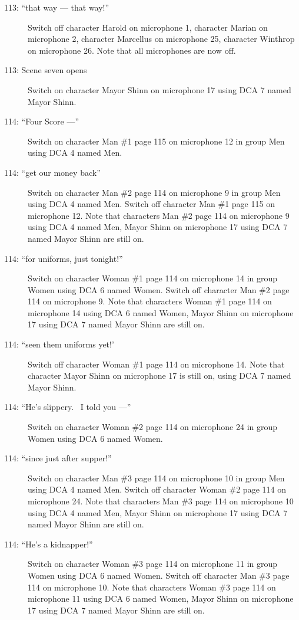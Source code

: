 \begin{description}
\item[113: ``that way --- that way!'']
Switch off character Harold on microphone 1, character Marian on microphone 2, character Marcellus on microphone 25, character Winthrop on microphone 26. Note that all microphones are now off.

\item[113: Scene seven opens]
Switch on character Mayor Shinn on microphone 17 using DCA 7 named Mayor Shinn. 

\item[114: ``Four Score ---'']
Switch on character Man \#1 page 115 on microphone 12 in group Men using DCA 4 named Men. 

\item[114: ``get our money back'']
Switch on character Man \#2 page 114 on microphone 9 in group Men using DCA 4 named Men. Switch off character Man \#1 page 115 on microphone 12. Note that characters Man \#2 page 114 on microphone 9 using DCA 4 named Men, Mayor Shinn on microphone 17 using DCA 7 named Mayor Shinn are still on.  

\item[114: ``for uniforms, just tonight!'']
Switch on character Woman \#1 page 114 on microphone 14 in group Women using DCA 6 named Women. Switch off character Man \#2 page 114 on microphone 9. Note that characters Woman \#1 page 114 on microphone 14 using DCA 6 named Women, Mayor Shinn on microphone 17 using DCA 7 named Mayor Shinn are still on.  

\item[114: ``seen them uniforms yet!']
Switch off character Woman \#1 page 114 on microphone 14. Note that character Mayor Shinn on microphone 17 is still on, using DCA 7 named Mayor Shinn.

\item[114: ``He's slippery.~ I told you ---'']
Switch on character Woman \#2 page 114 on microphone 24 in group Women using DCA 6 named Women. 

\item[114: ``since just after supper!'']
Switch on character Man \#3 page 114 on microphone 10 in group Men using DCA 4 named Men. Switch off character Woman \#2 page 114 on microphone 24. Note that characters Man \#3 page 114 on microphone 10 using DCA 4 named Men, Mayor Shinn on microphone 17 using DCA 7 named Mayor Shinn are still on.  

\item[114: ``He's a kidnapper!'']
Switch on character Woman \#3 page 114 on microphone 11 in group Women using DCA 6 named Women. Switch off character Man \#3 page 114 on microphone 10. Note that characters Woman \#3 page 114 on microphone 11 using DCA 6 named Women, Mayor Shinn on microphone 17 using DCA 7 named Mayor Shinn are still on.  


\end{description}
